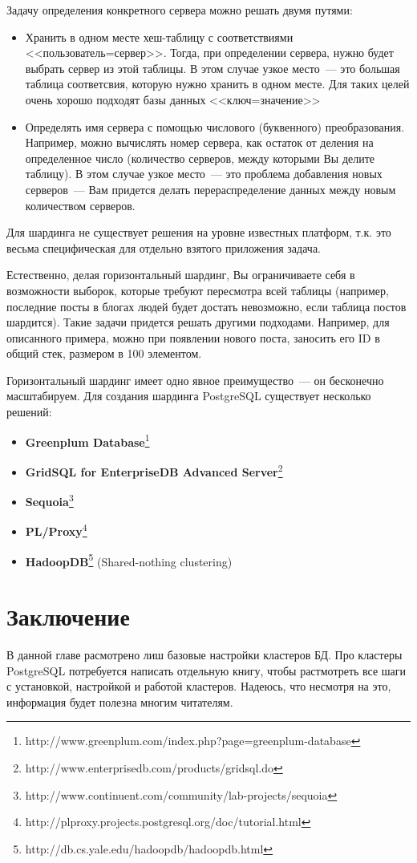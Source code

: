 Задачу определения конкретного сервера можно решать двумя путями:
\begin{itemize}
\item Хранить в одном месте хеш-таблицу с соответствиями <<пользователь=сервер>>. Тогда, при определении сервера, нужно будет 
выбрать сервер из этой таблицы. В этом случае узкое место~--- это большая таблица соответсвия, которую нужно хранить в одном месте. 
Для таких целей очень хорошо подходят базы данных <<ключ=значение>>
\item Определять имя сервера с помощью числового (буквенного) преобразования. Например, можно вычислять номер сервера, 
как остаток от деления на определенное число (количество серверов, между которыми Вы делите таблицу). В этом случае узкое место~--- 
это проблема добавления новых серверов~--- Вам придется делать перераспределение данных между новым количеством серверов.
\end{itemize}

Для шардинга не существует решения на уровне известных платформ, т.к. это весьма специфическая для отдельно взятого приложения задача.

Естественно, делая горизонтальный шардинг, Вы ограничиваете себя в возможности выборок, которые требуют 
пересмотра всей таблицы (например, последние посты в блогах людей будет достать невозможно, если таблица постов шардится). 
Такие задачи придется решать другими подходами. Например, для описанного примера, можно при появлении нового поста, заносить 
его ID в общий стек, размером в 100 элементом.

Горизонтальный шардинг имеет одно явное преимущество~--- он бесконечно масштабируем.
Для создания шардинга PostgreSQL существует несколько решений:
\begin{itemize}
\item \textbf{Greenplum Database}\footnote{http://www.greenplum.com/index.php?page=greenplum-database}
\item \textbf{GridSQL for EnterpriseDB Advanced Server}\footnote{http://www.enterprisedb.com/products/gridsql.do}
\item \textbf{Sequoia}\footnote{http://www.continuent.com/community/lab-projects/sequoia}
\item \textbf{PL/Proxy}\footnote{http://plproxy.projects.postgresql.org/doc/tutorial.html}
\item \textbf{HadoopDB}\footnote{http://db.cs.yale.edu/hadoopdb/hadoopdb.html} (Shared-nothing clustering)
\end{itemize}






\section{Заключение}
В данной главе расмотрено лиш базовые настройки кластеров БД. 
Про кластеры PostgreSQL потребуется написать отдельную книгу, чтобы растмотреть все шаги с установкой, настройкой и работой кластеров.
Надеюсь, что несмотря на это, информация будет полезна многим читателям.